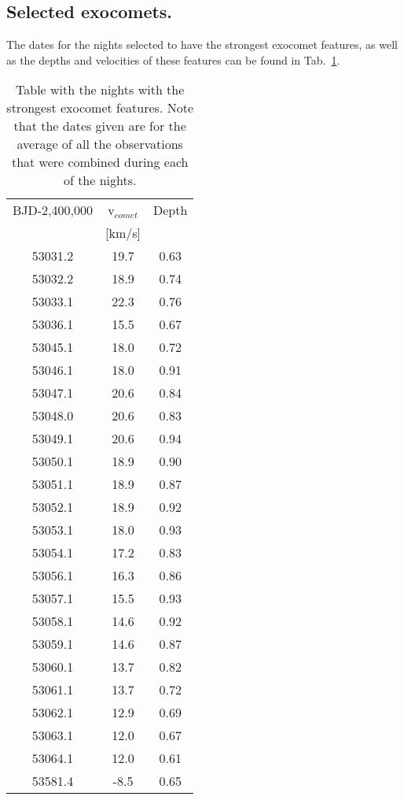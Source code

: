 \documentclass{aa}
\begin{document}




\clearpage
\FloatBarrier

\begin{appendix}
    
\section{Selected exocomets.}\label{sec:app_FEBs}
The dates for the nights selected to have the strongest exocomet features, as well as the depths and velocities of these features can be found in Tab.~\ref{tab:FEB_data}.
\begin{table}
\caption{Table with the nights with the strongest exocomet features. Note that the dates given are for the average of all the observations that were combined during each of the nights.}\label{tab:FEB_data}
\begin{tabular}{c c c}
   BJD-2,400,000  &    v$_{comet}$  &  Depth\\
 & [km/s] & \\
 \hline
\hline
53031.2 & 19.7 & 0.63\\
53032.2 & 18.9 & 0.74\\
53033.1 & 22.3 & 0.76\\
53036.1 & 15.5 & 0.67\\
53045.1 & 18.0 & 0.72\\
53046.1 & 18.0 & 0.91\\
53047.1 & 20.6 & 0.84\\
53048.0 & 20.6 & 0.83\\
53049.1 & 20.6 & 0.94\\
53050.1 & 18.9 & 0.90\\
53051.1 & 18.9 & 0.87\\
53052.1 & 18.9 & 0.92\\
53053.1 & 18.0 & 0.93\\
53054.1 & 17.2 & 0.83\\
53056.1 & 16.3 & 0.86\\
53057.1 & 15.5 & 0.93\\
53058.1 & 14.6 & 0.92\\
53059.1 & 14.6 & 0.87\\
53060.1 & 13.7 & 0.82\\
53061.1 & 13.7 & 0.72\\
53062.1 & 12.9 & 0.69\\
53063.1 & 12.0 & 0.67\\
53064.1 & 12.0 & 0.61\\
53581.4 & -8.5 & 0.65\\

\end{tabular}
\end{table}
\end{appendix}
\end{document}
